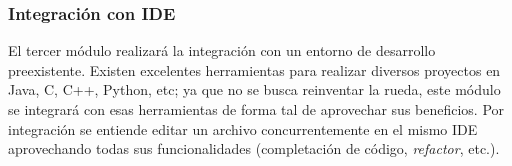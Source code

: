 \documentclass[a4paper,11pt]{article}
\begin{document}
				\subsubsection{Integraci\'on con IDE}
					El tercer m\'odulo realizar\'a la integraci\'on con un entorno de desarrollo
					preexistente. Existen excelentes herramientas para realizar diversos
					proyectos en Java, C, C++, Python, etc; ya que no se busca reinventar la rueda,
					este m\'odulo se integrar\'a con esas herramientas de forma tal de aprovechar sus
					beneficios. Por integraci\'on se entiende editar un archivo concurrentemente en
					el mismo IDE aprovechando todas sus funcionalidades (completaci\'on de c\'odigo,
					\textit{refactor}, etc.).
\end{document}
